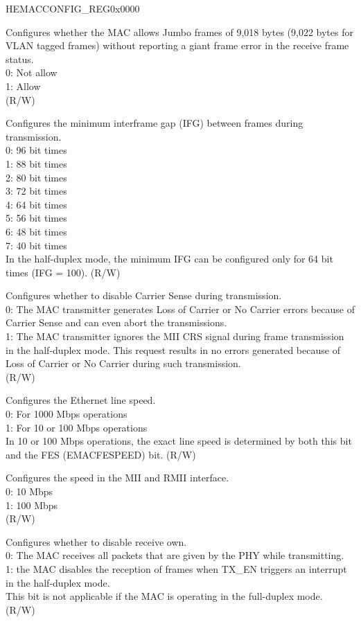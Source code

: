 \addtocounter{Regfloat}{-1}
\begin{register}{H}{EMACCONFIG\_REG}{0x0000}
\begin{regdesc}\begin{reglist}
\item[Continued from the previous page...]

\item [EMACJUMBOFRAME] Configures whether the MAC allows Jumbo frames of 9,018 bytes (9,022 bytes for VLAN tagged frames) without reporting a giant frame error in the receive frame status.\\
0: Not allow\\
1: Allow\\(R/W)
\item [EMACINTERFRAMEGAP] Configures the minimum interframe gap (IFG) between frames during transmission.\\
0: 96 bit times\\
1: 88 bit times\\
2: 80 bit times\\
3: 72 bit times\\
4: 64 bit times\\
5: 56 bit times\\
6: 48 bit times\\
7: 40 bit times\\
In the half-duplex mode, the minimum IFG can be configured only for 64 bit times (IFG = 100). (R/W)
\item [EMACDISABLECRS] Configures whether to disable Carrier Sense during transmission.\\
0: The MAC transmitter generates Loss of Carrier or No Carrier errors because of Carrier Sense and can even abort the transmissions. \\
1: The MAC transmitter ignores the MII CRS signal during frame transmission in the half-duplex mode. This request results in no errors generated because of Loss of Carrier or No Carrier during such transmission.\\
(R/W)
\item [EMACMII] Configures the Ethernet line speed.\\
0: For 1000 Mbps operations\\
1: For 10 or 100 Mbps operations\\
In 10 or 100 Mbps operations, the exact line speed is determined by both this bit and the FES (EMACFESPEED) bit. (R/W)
\item [EMACFESPEED] Configures the speed in the MII and RMII interface.\\
0: 10 Mbps\\
1: 100 Mbps\\(R/W)
\item [EMACRXOWN] Configures whether to disable receive own.\\
0: The MAC receives all packets that are given by the PHY while transmitting.\\
1: the MAC disables the reception of frames when TX\_EN triggers an interrupt in the half-duplex mode.\\
This bit is not applicable if the MAC is operating in the full-duplex mode. (R/W)


\end{reglist}
\end{regdesc}
\end{register}
